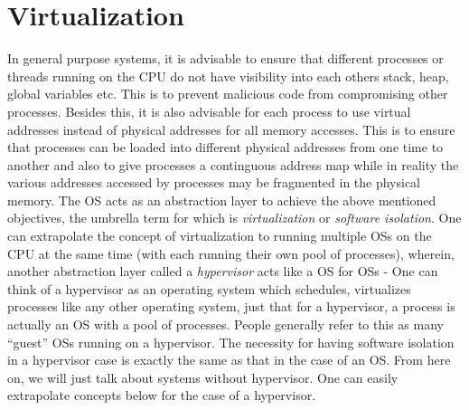 \chapter{Virtualization}
\label{chap:virtualization}
In general purpose systems, it is advisable to ensure that different processes or threads running on the CPU do not have visibility into each others stack, heap, global variables etc. This is to prevent malicious code from compromising other processes. Besides this, it is also advisable for each process to use virtual addresses instead of physical addresses for all memory accesses. This is to ensure that processes can be loaded into different physical addresses from one time to another and also to give processes a continguous address map while in reality the various addresses accessed by processes may be fragmented in the physical memory. The OS acts as an abstraction layer to achieve the above mentioned objectives, the umbrella term for which is \emph{virtualization} or \emph{software isolation}. One can extrapolate the concept of virtualization to running multiple OSs on the CPU at the same time (with each running their own pool of processes), wherein, another abstraction layer called a \emph{hypervisor} acts like a OS for OSs - One can think of a hypervisor as an operating system which schedules, virtualizes processes like any other operating system, just that for a hypervisor, a process is actually an OS with a pool of processes. People generally refer to this as many ``guest'' OSs running on a hypervisor. The necessity for having software isolation in a hypervisor case is exactly the same as that in the case of an OS. From here on, we will just talk about systems without hypervisor. One can easily extrapolate concepts below for the case of a hypervisor.
